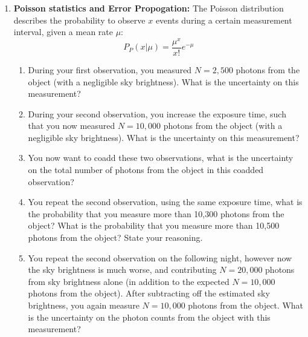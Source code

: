 \documentclass[11pt]{article}
\newcommand{\be}{\begin{equation}}
\newcommand{\ee}{\end{equation}}
\begin{document}
\begin{enumerate}
\item {\bf Poisson statistics and Error Propogation:}  The Poisson distribution describes the probability to observe $x$ events during a certain measurement interval, given a mean rate $\mu$:
\be
P_P (x | \mu) = \frac{\mu^x}{x!} e^{-\mu}
\ee
\begin{enumerate}[label=(\alph*)]
\item During your first observation, you measured $N = 2,500$ photons from the object (with a negligible sky brightness).  What is the uncertainty on this measurement?   
\item During your second observation, you increase the exposure time, such that you now measured $N = 10,000$ photons from the object (with a negligible sky brightness).  What is the uncertainty on this measurement?   
\item You now want to coadd these two observations, what is the uncertainty on the total number of photons from the object in this coadded observation?
\item You repeat the second observation, using the same exposure time, what is the probability that you measure more than 10,300 photons from the object?   What is the probability that you measure more than 10,500 photons from the object?  State your reasoning.  
\item You repeat the second observation on the following night, however now the sky brightness is much worse, and contributing $N = 20,000$ photons from sky brightness alone (in addition to the expected $N = 10,000$ photons from the object).  After subtracting off the estimated sky brightness, you again measure $N = 10,000$ photons from the object.  What is the uncertainty on the photon counts from the object with this measurement? 
\end{enumerate}

\end{enumerate}
\end{document}
